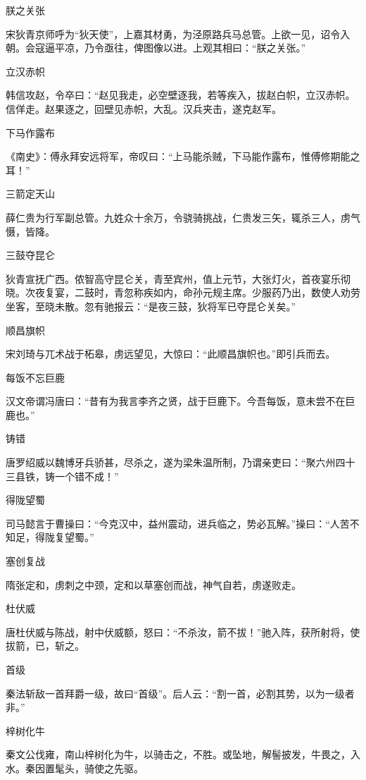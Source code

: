 \documentclass[a4paper,12pt,UTF8,twoside]{ctexbook}
\begin{document}
    朕之关张
    
    宋狄青京师呼为“狄天使”，上嘉其材勇，为泾原路兵马总管。上欲一见，诏令入朝。会寇逼平凉，乃令亟往，俾图像以进。上观其相曰：“朕之关张。”
    
    立汉赤帜
    
    韩信攻赵，令卒曰：“赵见我走，必空壁逐我，若等疾入，拔赵白帜，立汉赤帜。信佯走。赵果逐之，回壁见赤帜，大乱。汉兵夹击，遂克赵军。
    
    下马作露布
    
    《南史》：傅永拜安远将军，帝叹曰：“上马能杀贼，下马能作露布，惟傅修期能之耳！”
    
    三箭定天山
    
    薛仁贵为行军副总管。九姓众十余万，令骁骑挑战，仁贵发三矢，辄杀三人，虏气慑，皆降。
    
    三鼓夺昆仑
    
    狄青宣抚广西。侬智高守昆仑关，青至宾州，值上元节，大张灯火，首夜宴乐彻晓。次夜复宴，二鼓时，青忽称疾如内，命孙元规主席。少服药乃出，数使人劝劳坐客，至晓未散。忽有驰报云：“是夜三鼓，狄将军已夺昆仑关矣。”
    
    顺昌旗帜
    
    宋刘琦与兀术战于柘皋，虏远望见，大惊曰：“此顺昌旗帜也。”即引兵而去。
    
    每饭不忘巨鹿
    
    汉文帝谓冯唐曰：“昔有为我言李齐之贤，战于巨鹿下。今吾每饭，意未尝不在巨鹿也。”
    
    铸错
    
    唐罗绍威以魏博牙兵骄甚，尽杀之，遂为梁朱温所制，乃谓亲吏曰：“聚六州四十三县铁，铸一个错不成！”
    
    得陇望蜀
    
    司马懿言于曹操曰：“今克汉中，益州震动，进兵临之，势必瓦解。”操曰：“人苦不知足，得陇复望蜀。”
    
    塞创复战
    
    隋张定和，虏刺之中颈，定和以草塞创而战，神气自若，虏遂败走。
    
    杜伏威
    
    唐杜伏威与陈战，射中伏威额，怒曰：“不杀汝，箭不拔！”驰入阵，获所射将，使拔箭，已，斩之。
    
    首级
    
    秦法斩敌一首拜爵一级，故曰“首级”。后人云：“割一首，必割其势，以为一级者非。”
    
    梓树化牛
    
    秦文公伐雍，南山梓树化为牛，以骑击之，不胜。或坠地，解髻披发，牛畏之，入水。秦因置髦头，骑使之先驱。
    
\end{document}
